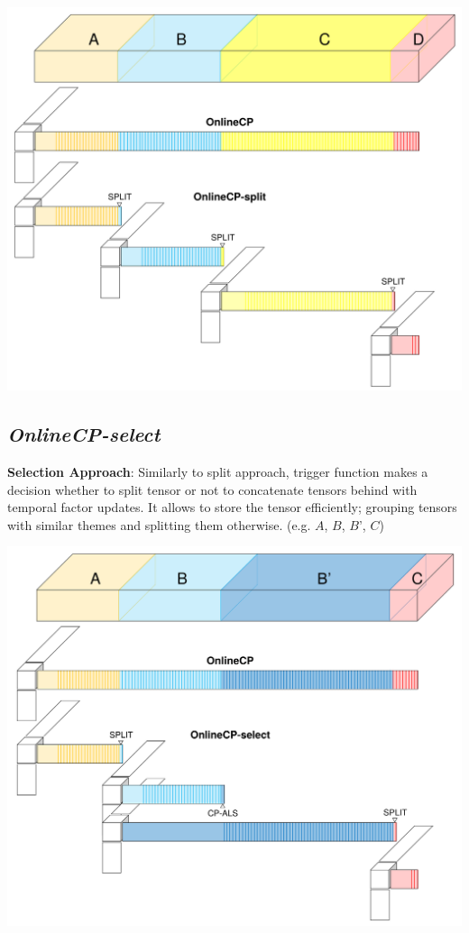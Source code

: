 \begin{center}
	\includegraphics[width=1\textwidth]{FIG/OnlineCP-split.png}
\end{center}

\newpage
\subsection{\em OnlineCP-select}
\textbf{Selection Approach}: Similarly to split approach, trigger function makes a decision whether to split tensor or not to concatenate tensors behind with temporal factor updates. It allows to store the tensor efficiently; grouping tensors with similar themes and splitting them otherwise. (e.g. $A$, $B$, $B’$, $C$)

\begin{center}
	\includegraphics[width=1\textwidth]{FIG/OnlineCP-select.png}
\end{center}